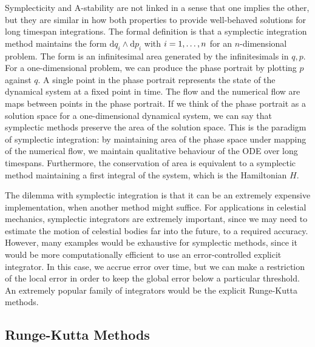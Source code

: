 \documentclass{report}
\theoremstyle{exampstyle} \newtheorem{example}[theorem]{Example}
\theoremstyle{exampstyle} \newtheorem{remark}[theorem]{Remark}
\theoremstyle{exampstyle} \newtheorem{definition}[theorem]{Definition}
\theoremstyle{exampstyle} \newtheorem{lemma}[theorem]{Lemma}
\begin{document}
Symplecticity and A-stability are not linked in a sense that one implies the other, but they are similar in how both properties to provide well-behaved solutions for long timespan integrations.
The formal definition is that a symplectic integration method maintains the form $\mathrm{d}q_i \wedge \mathrm{d}p_i$ with $i = 1, \mathellipsis, n$ for an $n$-dimensional problem.
The form is an infinitesimal area generated by the infinitesimals in $q, p$.
For a one-dimensional problem, we can produce the phase portrait by plotting $p$ against $q$.
A single point in the phase portrait represents the state of the dynamical system at a fixed point in time.
The flow and the numerical flow are maps between points in the phase portrait.
If we think of the phase portrait as a solution space for a one-dimensional dynamical system, we can say that symplectic methods preserve the area of the solution space.
This is the paradigm of symplectic integration: by maintaining area of the phase space under mapping of the numerical flow, we maintain qualitative behaviour of the ODE over long timespans.
Furthermore, the conservation of area is equivalent to a symplectic method maintaining a first integral of the system, which is the Hamiltonian $H$.

The dilemma with symplectic integration is that it can be an extremely expensive implementation, when another method might suffice.
For applications in celestial mechanics, symplectic integrators are extremely important, since we may need to estimate the motion of celestial bodies far into the future, to a required accuracy.
However, many examples would be exhaustive for symplectic methods, since it would be more computationally efficient to use an error-controlled explicit integrator.
In this case, we accrue error over time, but we can make a restriction of the local error in order to keep the global error below a particular threshold.
An extremely popular family of integrators would be the explicit Runge-Kutta methods.

\subsection{Runge-Kutta Methods}
\end{document}
